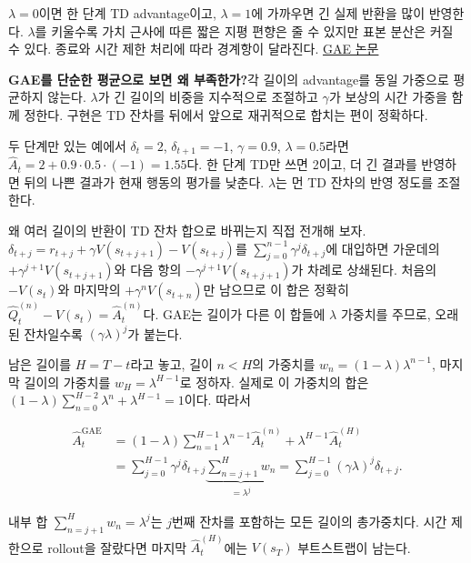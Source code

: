 \documentclass[11pt,a4paper]{article}
\begin{document}
$\lambda=0$이면 한 단계 TD advantage이고, $\lambda=1$에 가까우면 긴 실제 반환을 많이 반영한다. $\lambda$를 키울수록 가치 근사에 따른 짧은 지평 편향은 줄 수 있지만 표본 분산은 커질 수 있다. 종료와 시간 제한 처리에 따라 경계항이 달라진다. \href{https://arxiv.org/abs/1506.02438}{GAE 논문}\par

\par\medskip\noindent\textbf{GAE를 단순한 평균으로 보면 왜 부족한가?}\quad 각 길이의 advantage를 동일 가중으로 평균하지 않는다. $\lambda$가 긴 길이의 비중을 지수적으로 조절하고 $\gamma$가 보상의 시간 가중을 함께 정한다. 구현은 TD 잔차를 뒤에서 앞으로 재귀적으로 합치는 편이 정확하다.\par

두 단계만 있는 예에서 $\delta_t=2$, $\delta_{t+1}=-1$, $\gamma=0.9$, $\lambda=0.5$라면 $\widehat A_t=2+0.9\cdot0.5\cdot(-1)=1.55$다. 한 단계 TD만 쓰면 2이고, 더 긴 결과를 반영하면 뒤의 나쁜 결과가 현재 행동의 평가를 낮춘다. $\lambda$는 먼 TD 잔차의 반영 정도를 조절한다.\par

왜 여러 길이의 반환이 TD 잔차 합으로 바뀌는지 직접 전개해 보자. $\delta_{t+j}=r_{t+j}+\gamma V(s_{t+j+1})-V(s_{t+j})$를 $\sum_{j=0}^{n-1}\gamma^j\delta_{t+j}$에 대입하면 가운데의 $+\gamma^{j+1}V(s_{t+j+1})$와 다음 항의 $-\gamma^{j+1}V(s_{t+j+1})$가 차례로 상쇄된다. 처음의 $-V(s_t)$와 마지막의 $+\gamma^nV(s_{t+n})$만 남으므로 이 합은 정확히 $\widehat Q_t^{(n)}-V(s_t)=\widehat A_t^{(n)}$다. GAE는 길이가 다른 이 합들에 $\lambda$ 가중치를 주므로, 오래된 잔차일수록 $(\gamma\lambda)^j$가 붙는다.\par

남은 길이를 $H=T-t$라고 놓고, 길이 $n<H$의 가중치를 $w_n=(1-\lambda)\lambda^{n-1}$, 마지막 길이의 가중치를 $w_H=\lambda^{H-1}$로 정하자. 실제로 이 가중치의 합은 $(1-\lambda)\sum_{n=0}^{H-2}\lambda^n+\lambda^{H-1}=1$이다. 따라서\par

\[
\begin{aligned}
\widehat A_t^{\mathrm{GAE}}
&=(1-\lambda)\sum_{n=1}^{H-1}\lambda^{n-1}\widehat A_t^{(n)}
+\lambda^{H-1}\widehat A_t^{(H)}\\
&=\sum_{j=0}^{H-1}\gamma^j\delta_{t+j}
\underbrace{\sum_{n=j+1}^{H}w_n}_{=\lambda^j}
=\sum_{j=0}^{H-1}(\gamma\lambda)^j\delta_{t+j}.
\end{aligned}
\]

내부 합 $\sum_{n=j+1}^Hw_n=\lambda^j$는 $j$번째 잔차를 포함하는 모든 길이의 총가중치다. 시간 제한으로 rollout을 잘랐다면 마지막 $\widehat A_t^{(H)}$에는 $V(s_T)$ 부트스트랩이 남는다.\par
\end{document}
